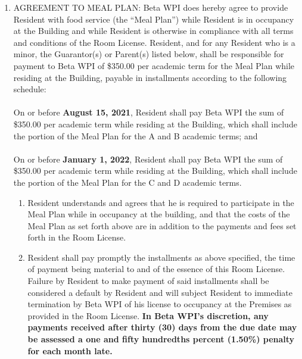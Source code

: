 \documentclass[legalpaper, 12pt]{article}
\begin{document}
\begin{enumerate}
        \item\label{itm:mealplan} AGREEMENT TO MEAL PLAN\@: Beta WPI does
                hereby agree to provide Resident with food service (the ``Meal
                Plan'') while Resident is in occupancy at the Building and
                while Resident is otherwise in compliance with all terms and
                conditions of the Room License.  Resident, and for any Resident
                who is a minor, the Guarantor(s) or Parent(s) listed below,
                shall be responsible for payment to Beta WPI of \$350.00 per
                academic term for the Meal Plan while residing at the Building,
                payable in installments according to the following
                schedule:\\\\ On or before \textbf{August 15, 2021}, Resident
                shall pay Beta WPI the sum of \$350.00 per academic term while
                residing at the Building, which shall include the portion of
                the Meal Plan for the A and B academic terms; and\\\\ On or
                before \textbf{January 1, 2022}, Resident shall pay Beta WPI
                the sum of \$350.00 per academic term while residing at the
                Building, which shall include the portion of the Meal Plan for
                the C and D academic terms.  \begin{enumerate}[label=\Alph*.]

                        \item Resident understands and agrees that he is
                                required to participate in the Meal Plan while
                                in occupancy at the building, and that the
                                costs of the Meal Plan as set forth above are
                                in addition to the payments and fees set forth
                                in the Room License.

                        \item Resident shall pay promptly the installments as
                                above specified, the time of payment being
                                material to and of the essence of this Room
                                License. Failure by Resident to make payment of
                                said installments shall be considered a default
                                by Resident and will subject Resident to
                                immediate termination by Beta WPI of his
                                license to occupancy at the Premises as
                                provided in the Room License. \textbf{In Beta
                                WPI's discretion, any payments received after
                                thirty (30) days from the due date may be
                                assessed a one and fifty hundredths percent
                                (1.50\%) penalty for each month late.}


\end{enumerate}
\end{enumerate}
\end{document}
